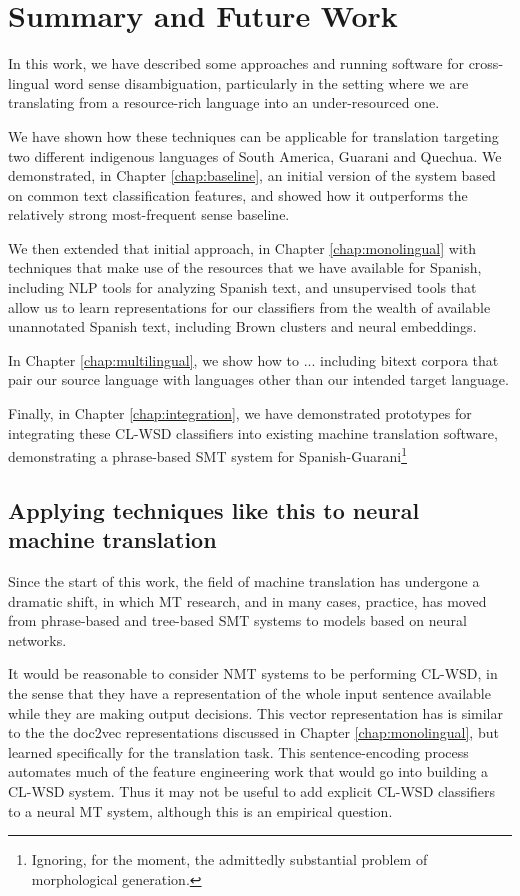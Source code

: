 \chapter{Summary and Future Work}
\label{chap:conclusions}

In this work, we have described some approaches and running software for
cross-lingual word sense disambiguation, particularly in the setting where we
are translating from a resource-rich language into an under-resourced one.

We have shown how these techniques can be applicable for translation targeting
two different indigenous languages of South America, Guarani and Quechua. We
demonstrated, in Chapter \ref{chap:baseline}, an initial version of the system
based on common text classification features, and showed how it outperforms the
relatively strong most-frequent sense baseline.

We then extended that initial approach, in Chapter \ref{chap:monolingual} with
techniques that make use of the resources that we have available for Spanish,
including NLP tools for analyzing Spanish text, and unsupervised tools that
allow us to learn representations for our classifiers from the wealth of
available unannotated Spanish text, including Brown clusters and neural
embeddings.

In Chapter \ref{chap:multilingual}, we show how to ...
including bitext corpora that pair our source language with languages other
than our intended target language.

Finally, in Chapter \ref{chap:integration}, we have demonstrated prototypes for
integrating these CL-WSD classifiers into existing machine translation
software, demonstrating a phrase-based SMT system for
Spanish-Guarani\footnote{Ignoring, for the moment, the admittedly substantial
problem of morphological generation.} 


\section{Applying techniques like this to neural machine translation}
Since the start of this work, the field of machine translation has undergone a
dramatic shift, in which MT research, and in many cases, practice\cite{gnmt},
has moved from phrase-based and tree-based SMT systems to models based on
neural networks.

It would be reasonable to consider NMT systems to be performing CL-WSD, in the
sense that they have a representation of the whole input sentence available
while they are making output decisions. This vector representation has is
similar to the the doc2vec representations discussed in Chapter
\ref{chap:monolingual}, but learned specifically for the translation task. This
sentence-encoding process automates much of the feature engineering work that
would go into building a CL-WSD system. Thus it may not be useful to add
explicit CL-WSD classifiers to a neural MT system, although this is an
empirical question.

